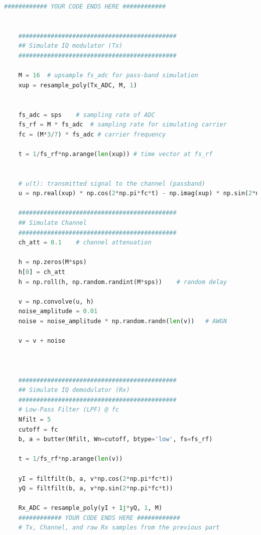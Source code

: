 \documentclass[
	letterpaper, %
	10pt, %
]{CSUniSchoolLabReport}
\begin{document}
\begin{lstlisting}[language=Python]
	############ YOUR CODE ENDS HERE ############
	
	
	############################################
	## Simulate IQ modulator (Tx)
	############################################
	
	M = 16  # upsample fs_adc for pass-band simulation
	xup = resample_poly(Tx_ADC, M, 1)
	
	
	fs_adc = sps    # sampling rate of ADC
	fs_rf = M * fs_adc  # sampling rate for simulating carrier
	fc = (M*3/7) * fs_adc # carrier frequency
	
	t = 1/fs_rf*np.arange(len(xup)) # time vector at fs_rf
	
	
	# u(t): transmitted signal to the channel (passband)
	u = np.real(xup) * np.cos(2*np.pi*fc*t) - np.imag(xup) * np.sin(2*np.pi*fc*t)
	
	############################################
	## Simulate Channel
	############################################
	ch_att = 0.1    # channel attenuation
	
	h = np.zeros(M*sps)
	h[0] = ch_att
	h = np.roll(h, np.random.randint(M*sps))    # random delay
	
	v = np.convolve(u, h) 
	noise_amplitude = 0.01
	noise = noise_amplitude * np.random.randn(len(v))   # AWGN
	
	v = v + noise
	
	
	
	############################################
	## Simulate IQ demodulator (Rx)
	############################################
	# Low-Pass Filter (LPF) @ fc
	Nfilt = 5
	cutoff = fc
	b, a = butter(Nfilt, Wn=cutoff, btype='low', fs=fs_rf)
	
	t = 1/fs_rf*np.arange(len(v))
	
	yI = filtfilt(b, a, v*np.cos(2*np.pi*fc*t))
	yQ = filtfilt(b, a, v*np.sin(2*np.pi*fc*t))
	
	Rx_ADC = resample_poly(yI + 1j*yQ, 1, M)
	############ YOUR CODE ENDS HERE ############
	# Tx, Channel, and raw Rx samples from the previous part
	

\end{lstlisting}
\end{document}
